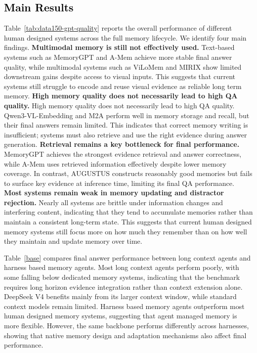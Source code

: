 \documentclass{article}
\begin{document}
\subsection{\textcolor{black}{Main Results}}
Table~\ref{tab:data150-gpt-quality} reports the overall performance of different human designed systems across the full memory lifecycle. We identify four main findings. \textbf{Multimodal memory is still not effectively used.}  Text-based systems such as MemoryGPT and A-Mem achieve more stable final answer quality, while multimodal systems such as ViLoMem and MIRIX show limited downstream gains despite access to visual inputs. This suggests that current systems still struggle to encode and reuse visual evidence as reliable long term memory.  \textbf{High memory quality does not necessarily lead to high QA quality.} High memory quality does not necessarily lead to high QA quality. Qwen3-VL-Embedding and M2A perform well in memory storage and recall, but their final answers remain limited. This indicates that correct memory writing is insufficient; systems must also retrieve and use the right evidence during answer generation.  \textbf{Retrieval remains a key bottleneck for final performance.} MemoryGPT achieves the strongest evidence retrieval and answer correctness, while A-Mem uses retrieved information effectively despite lower memory coverage. In contrast, AUGUSTUS constructs reasonably good memories but fails to surface key evidence at inference time, limiting its final QA performance.  \textbf{Most systems remain weak in memory updating and distractor rejection.}  Nearly all systems are brittle under information changes and interfering content, indicating that they tend to accumulate memories rather than maintain a consistent long-term state. This suggests that current human designed memory systems still focus more on how much they remember than on how well they maintain and update memory over time.


Table~\ref{base} compares final answer performance between long context agents and harness based memory agents. Most long context agents perform poorly, with some falling below dedicated memory systems, indicating that the benchmark requires long horizon evidence integration rather than context extension alone. DeepSeek V4 benefits mainly from its larger context window, while standard context models remain limited. Harness based memory agents outperform most human designed memory systems, suggesting that agent managed memory is more flexible. However, the same backbone performs differently across harnesses, showing that native memory design and adaptation mechanisms also affect final performance.
\end{document}
